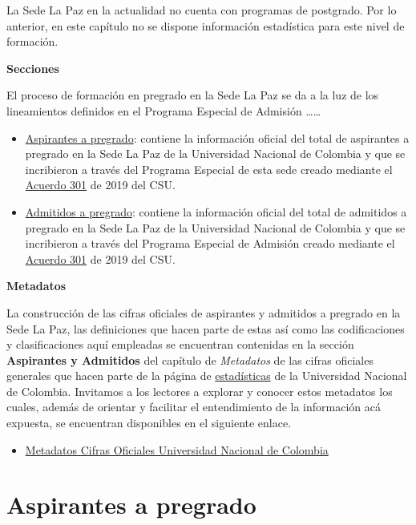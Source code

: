 \documentclass[
]{book}
\providecommand{\tightlist}{%
  \setlength{\itemsep}{0pt}\setlength{\parskip}{0pt}}
\begin{document}
La Sede La Paz en la actualidad no cuenta con programas de postgrado. Por lo anterior, en este capítulo no se dispone información estadística para este nivel de formación.

\textbf{Secciones}

El proceso de formación en pregrado en la Sede La Paz se da a la luz de los lineamientos definidos en el Programa Especial de Admisión \ldots\ldots{}

\begin{itemize}
\item
  \protect\hyperlink{AspPre}{Aspirantes a pregrado}: contiene la información oficial del total de aspirantes a pregrado en la Sede La Paz de la Universidad Nacional de Colombia y que se incribieron a través del Programa Especial de esta sede creado mediante el \href{http://www.legal.unal.edu.co/rlunal/home/doc.jsp?d_i=93599}{Acuerdo 301} de 2019 del CSU.
\item
  \protect\hyperlink{AdmPre}{Admitidos a pregrado}: contiene la información oficial del total de admitidos a pregrado en la Sede La Paz de la Universidad Nacional de Colombia y que se incribieron a través del Programa Especial de Admisión creado mediante el \href{http://www.legal.unal.edu.co/rlunal/home/doc.jsp?d_i=93599}{Acuerdo 301} de 2019 del CSU.
\end{itemize}

\textbf{Metadatos}

La construcción de las cifras oficiales de aspirantes y admitidos a pregrado en la Sede La Paz, las definiciones que hacen parte de estas así como las codificaciones y clasificaciones aquí empleadas se encuentran contenidas en la sección \textbf{Aspirantes y Admitidos} del capítulo de \emph{Metadatos} de las cifras oficiales generales que hacen parte de la página de \href{http://estadisticas.unal.edu.co/home/}{estadísticas} de la Universidad Nacional de Colombia. Invitamos a los lectores a explorar y conocer estos metadatos los cuales, además de orientar y facilitar el entendimiento de la información acá expuesta, se encuentran disponibles en el siguiente enlace.

\begin{itemize}
\tightlist
\item
  \href{http://estadisticas.unal.edu.co/menu-principal/cifras-generales/metadatos/cifras-generales/}{Metadatos Cifras Oficiales Universidad Nacional de Colombia}
\end{itemize}

\hypertarget{AspPre}{%
\section{Aspirantes a pregrado}\label{AspPre}}
\end{document}
